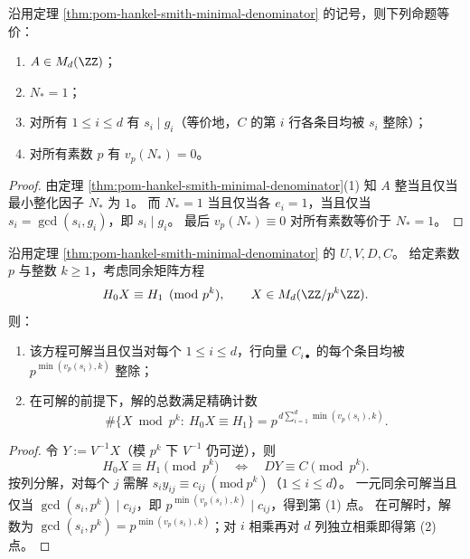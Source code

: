 \begin{corollary}\label{cor:pom-hankel-integer-realization-criterion}
沿用定理 \ref{thm:pom-hankel-smith-minimal-denominator} 的记号，则下列命题等价：
\begin{enumerate}
  \item \(A\in M_d(\ZZ)\)；
  \item \(N_\ast=1\)；
  \item 对所有 \(1\le i\le d\) 有 \(s_i\mid g_i\)（等价地，\(C\) 的第 \(i\) 行各条目均被 \(s_i\) 整除）；
  \item 对所有素数 \(p\) 有 \(v_p(N_\ast)=0\)。
\end{enumerate}
\end{corollary}
\begin{proof}
由定理 \ref{thm:pom-hankel-smith-minimal-denominator}(1) 知 \(A\) 整当且仅当最小整化因子 \(N_\ast\) 为 \(1\)。
而 \(N_\ast=1\) 当且仅当各 \(e_i=1\)，当且仅当 \(s_i=\gcd(s_i,g_i)\)，即 \(s_i\mid g_i\)。
最后 \(v_p(N_\ast)\equiv 0\) 对所有素数等价于 \(N_\ast=1\)。
\end{proof}

\begin{theorem}\label{thm:pom-hankel-modpk-solvability-count}
沿用定理 \ref{thm:pom-hankel-smith-minimal-denominator} 的 \(U,V,D,C\)。
给定素数 \(p\) 与整数 \(k\ge 1\)，考虑同余矩阵方程
\[
H_0X\equiv H_1\pmod{p^k},
\qquad
X\in M_d(\ZZ/p^k\ZZ).
\]
则：
\begin{enumerate}
  \item 该方程可解当且仅当对每个 \(1\le i\le d\)，行向量 \(C_{i\bullet}\) 的每个条目均被 \(p^{\min(v_p(s_i),k)}\) 整除；
  \item 在可解的前提下，解的总数满足精确计数
  \[
  \#\{X\bmod p^k:\ H_0X\equiv H_1\}=
  p^{\,d\sum_{i=1}^{d}\min(v_p(s_i),k)}.
  \]
\end{enumerate}
\end{theorem}
\begin{proof}
令 \(Y:=V^{-1}X\)（模 \(p^k\) 下 \(V^{-1}\) 仍可逆），则
\[
H_0X\equiv H_1\pmod{p^k}
\quad\Longleftrightarrow\quad
D Y\equiv C\pmod{p^k}.
\]
按列分解，对每个 \(j\) 需解
\(
s_i y_{ij}\equiv c_{ij}\ (\mathrm{mod}\ p^k)
\)（\(1\le i\le d\)）。
一元同余可解当且仅当 \(\gcd(s_i,p^k)\mid c_{ij}\)，即 \(p^{\min(v_p(s_i),k)}\mid c_{ij}\)，得到第 (1) 点。
在可解时，解数为 \(\gcd(s_i,p^k)=p^{\min(v_p(s_i),k)}\)；对 \(i\) 相乘再对 \(d\) 列独立相乘即得第 (2) 点。
\end{proof}

